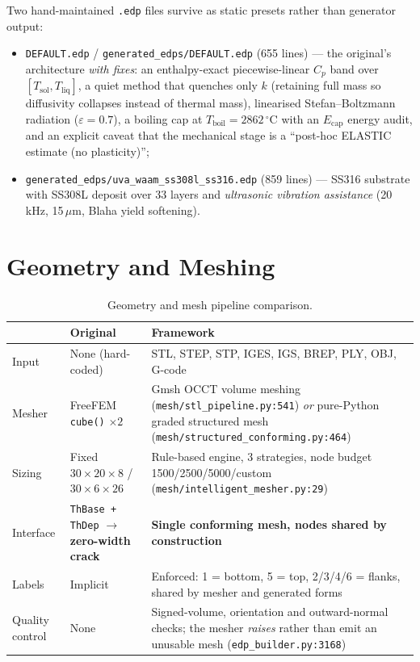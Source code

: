\documentclass[10pt,a4paper]{article}
\newcommand{\code}[1]{\texttt{#1}}
\newcommand{\file}[1]{\texttt{\small #1}}
\begin{document}
Two hand-maintained \code{.edp} files survive as static presets rather than
generator output:
\begin{itemize}[leftmargin=1.4em,itemsep=0.15em]
    \item \file{DEFAULT.edp} / \file{generated\_edps/DEFAULT.edp} (655 lines)
    --- the original's architecture \emph{with fixes}: an enthalpy-exact
    piecewise-linear $C_p$ band over $[T_{\text{sol}}, T_{\text{liq}}]$, a
    quiet method that quenches only $k$ (retaining full mass so diffusivity
    collapses instead of thermal mass), linearised Stefan--Boltzmann radiation
    ($\varepsilon = 0.7$), a boiling cap at $T_{\text{boil}} = 2862\,^\circ$C
    with an $E_{\text{cap}}$ energy audit, and an explicit caveat that the
    mechanical stage is a ``post-hoc ELASTIC estimate (no plasticity)'';
    \item \file{generated\_edps/uva\_waam\_ss308l\_ss316.edp} (859 lines) ---
    SS316 substrate with SS308L deposit over 33 layers and \emph{ultrasonic
    vibration assistance} (20\,kHz, 15\,$\mu$m, Blaha yield softening).
\end{itemize}

\section{Geometry and Meshing}

\begin{table}[h!]
\centering
\caption{Geometry and mesh pipeline comparison.}
\label{tab:mesh}
\small
\begin{tabularx}{\linewidth}{@{}l X X@{}}
\toprule
& \textbf{Original} & \textbf{Framework} \\
\midrule
Input & None (hard-coded) & STL, STEP, STP, IGES, IGS, BREP, PLY, OBJ, G-code \\
\addlinespace
Mesher & FreeFEM \code{cube()} $\times 2$ & Gmsh OCCT volume meshing
(\file{mesh/stl\_pipeline.py:541}) \emph{or} pure-Python graded structured
mesh (\file{mesh/structured\_conforming.py:464}) \\
\addlinespace
Sizing & Fixed $30\times20\times8$ / $30\times6\times26$ & Rule-based engine,
3 strategies, node budget 1500/2500/5000/custom
(\file{mesh/intelligent\_mesher.py:29}) \\
\addlinespace
Interface & \code{ThBase + ThDep} $\rightarrow$ \textbf{zero-width crack} &
\textbf{Single conforming mesh, nodes shared by construction} \\
\addlinespace
Labels & Implicit & Enforced: 1 = bottom, 5 = top, 2/3/4/6 = flanks, shared by
mesher and generated forms \\
\addlinespace
Quality control & None & Signed-volume, orientation and outward-normal checks;
the mesher \emph{raises} rather than emit an unusable mesh
(\file{edp\_builder.py:3168}) \\
\bottomrule
\end{tabularx}
\end{table}
\end{document}
